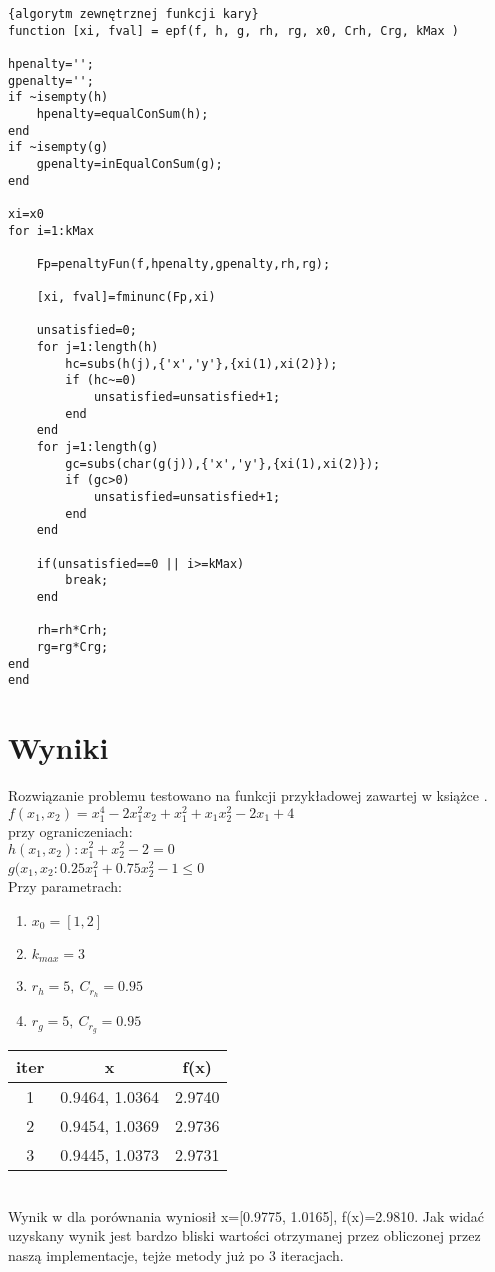 \documentclass{classrep}
\begin{document}
\begin{lstlisting}{algorytm zewnętrznej funkcji kary}
function [xi, fval] = epf(f, h, g, rh, rg, x0, Crh, Crg, kMax )

hpenalty='';
gpenalty='';
if ~isempty(h)
    hpenalty=equalConSum(h);
end
if ~isempty(g)
    gpenalty=inEqualConSum(g);
end

xi=x0
for i=1:kMax

    Fp=penaltyFun(f,hpenalty,gpenalty,rh,rg);
    
    [xi, fval]=fminunc(Fp,xi)
    
    unsatisfied=0;
    for j=1:length(h)
        hc=subs(h(j),{'x','y'},{xi(1),xi(2)});
        if (hc~=0)
            unsatisfied=unsatisfied+1;
        end
    end
    for j=1:length(g)
        gc=subs(char(g(j)),{'x','y'},{xi(1),xi(2)});
        if (gc>0)
            unsatisfied=unsatisfied+1;
        end
    end
    
    if(unsatisfied==0 || i>=kMax)
        break;
    end

    rh=rh*Crh;
    rg=rg*Crg;
end
end

\end{lstlisting}



\section{Wyniki}

Rozwiązanie problemu testowano na funkcji przykładowej zawartej w książce \cite{3}.\\

$f(x_1, x_2) = x^4 _1 - 2 x^2 _1 x_2 + x^2 _1 + x_1 x^2 _2 - 2x_1 +4 $\\
przy ograniczeniach:\\
$h(x_1, x_2): x^2 _1 + x^2 _2 -2 = 0 $\\
$g(x_1, x_2: 0.25x^2 _1 + 0.75 x^2 _2 -1 \leq 0 $
$ $\\

Przy parametrach:\\
\begin{enumerate}
\item $x_0 = [1, 2]$
\item $k_{max}=3$
\item $r_h=5,\ C_{r_h}=0.95$
\item $r_g=5,\ C_{r_g}=0.95$
\end{enumerate}

\begin{center}
\begin{tabular}{|c|c|c|}
\hline 
iter & x & f(x)\\
\hline
1 & 0.9464, 1.0364 & 2.9740\\ 
\hline 
2 &  0.9454, 1.0369 & 2.9736\\ 
\hline 
3 & 0.9445, 1.0373 & 2.9731\\ 
\hline 
\end{tabular} 
\end{center}
\\
Wynik w \cite{2} dla porównania wyniosił x=[0.9775, 1.0165], f(x)=2.9810.
Jak widać uzyskany wynik jest bardzo bliski wartości otrzymanej przez obliczonej przez naszą implementacje, tejże metody już po 3 iteracjach.
\end{document}
